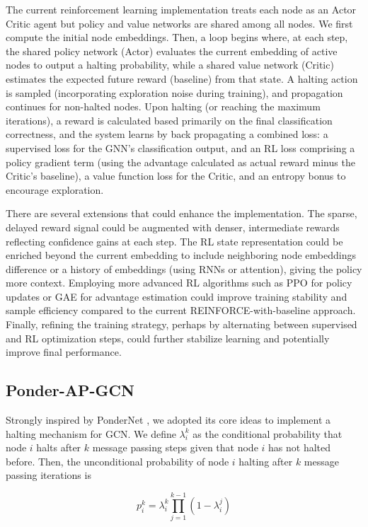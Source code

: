 \documentclass{gdl}
\begin{document}
The current reinforcement learning implementation treats each node as an Actor Critic agent but policy and value networks are shared among all nodes. We first compute the initial node embeddings. Then, a loop begins where, at each step, the shared policy network (Actor) evaluates the current embedding of active nodes to output a halting probability, while a shared value network (Critic) estimates the expected future reward (baseline) from that state. A halting action is sampled (incorporating exploration noise during training), and propagation continues for non-halted nodes. Upon halting (or reaching the maximum iterations), a reward is calculated based primarily on the final classification correctness, and the system learns by back propagating a combined loss: a supervised loss for the GNN's classification output, and an RL loss comprising a policy gradient term (using the advantage calculated as actual reward minus the Critic's baseline), a value function loss for the Critic, and an entropy bonus to encourage exploration.

There are several extensions that could enhance the implementation. The sparse, delayed reward signal could be augmented with denser, intermediate rewards reflecting confidence gains at each step. The RL state representation could be enriched beyond the current embedding to include neighboring node embeddings difference or a history of embeddings (using RNNs or attention), giving the policy more context. Employing more advanced RL algorithms such as PPO for policy updates or GAE for advantage estimation could improve training stability and sample efficiency compared to the current REINFORCE-with-baseline approach. Finally, refining the training strategy, perhaps by alternating between supervised and RL optimization steps, could further stabilize learning and potentially improve final performance.

\subsection{Ponder-AP-GCN}
Strongly inspired by PonderNet \cite{banino2021}, we adopted its core ideas to implement a halting mechanism for GCN. We define $\lambda_i^k$ as the conditional probability that node $i$ halts after $k$ message passing steps given that node $i$ has not halted before. Then, the unconditional probability of node $i$ halting after $k$ message passing iterations is

$$
p_i^k = \lambda_i^k \prod_{j=1}^{k-1} (1-\lambda_i^j)
$$
\end{document}
